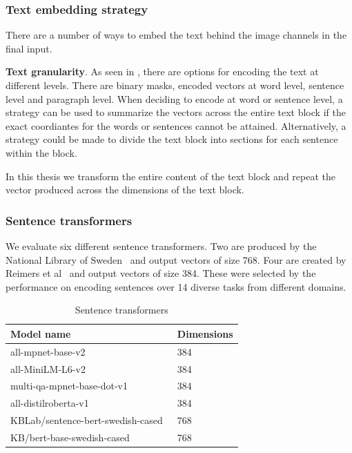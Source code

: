 \documentclass[oneside, english, bibtex]{kththesis}
\begin{document}
\subsubsection{Text embedding strategy}
\label{subs:textembeddingstrat}
There are a number of ways to embed the text behind the image channels in the final input.

\textbf{Text granularity}. As seen in , there are options for encoding the text at different levels. There are binary masks, encoded vectors at word level, sentence level and paragraph level. When deciding to encode at word or sentence level, a strategy can be used to summarize the vectors across the entire text block if the exact coordiantes for the words or sentences cannot be attained. Alternatively, a strategy could be made to divide the text block into sections for each sentence within the block. 

In this thesis we transform the entire content of the text block and repeat the vector produced across the dimensions of the text block. 

\subsubsection{Sentence transformers}

We evaluate six different sentence transformers. Two are produced by the National Library of Sweden~\cite{swedish-bert} and output vectors of size 768. Four are created by Reimers et al~\cite{reimers-2019-sentence-bert, reimers-2020-multilingual-sentence-bert} and output vectors of size 384. These were selected by the performance on encoding sentences over 14 diverse tasks from different domains. 

\begin{table}[H]
  \begin{center}
    \caption{Sentence transformers}
    \label{tab:modeldimensions}
    \begin{tabular}{l|l}
    \textbf{Model name} & \textbf{Dimensions}  \\
    \hline
    all-mpnet-base-v2~\cite{reimers-2019-sentence-bert, reimers-2020-multilingual-sentence-bert} & 384 \\    \hline
    all-MiniLM-L6-v2~\cite{reimers-2019-sentence-bert, reimers-2020-multilingual-sentence-bert} & 384 \\    \hline
    multi-qa-mpnet-base-dot-v1~\cite{reimers-2019-sentence-bert, reimers-2020-multilingual-sentence-bert} & 384 \\    \hline
    all-distilroberta-v1~\cite{reimers-2019-sentence-bert, reimers-2020-multilingual-sentence-bert} & 384 \\    \hline
    KBLab/sentence-bert-swedish-cased~\cite{swedish-bert} & 768 \\    \hline
    KB/bert-base-swedish-cased~\cite{swedish-bert} & 768 \\    \hline
    \end{tabular}
  \end{center}
\end{table}
\end{document}
